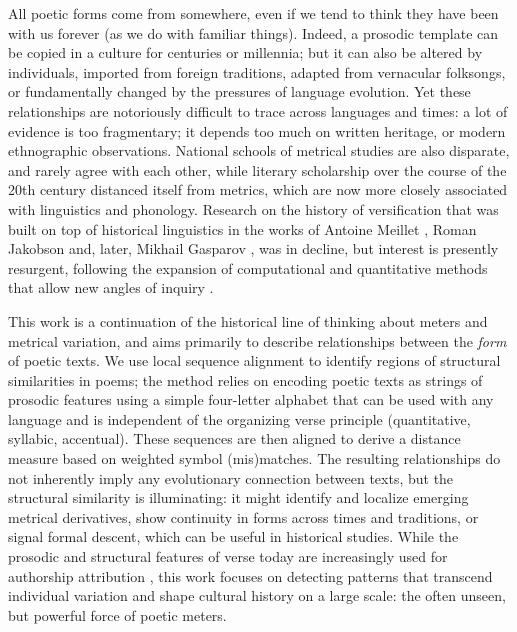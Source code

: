 \documentclass[
    hf
]{ceurart}
\begin{document}
All poetic forms come from somewhere, even if we tend to think they have been with us forever (as we do with familiar things). Indeed, a prosodic template can be copied in a culture for centuries or millennia; but it can also be altered by individuals, imported from foreign traditions, adapted from vernacular folksongs, or fundamentally changed by the pressures of language evolution. Yet these relationships are notoriously difficult to trace across languages and times: a lot of evidence is too fragmentary; it depends too much on written heritage, or modern ethnographic observations. National schools of metrical studies are also disparate, and rarely agree with each other, while literary scholarship over the course of the 20th century distanced itself from metrics, which are now more closely associated with linguistics and phonology. Research on the history of versification that was built on top of historical linguistics in the works of Antoine Meillet \cite{meillet_origines_1923}, Roman Jakobson \cite{jakobson_zur_1929} and, later, Mikhail Gasparov \cite{gasparov_history_1996}, was in decline, but interest is presently resurgent, following the expansion of computational and quantitative methods that allow new angles of inquiry \cite{polilova_spanish_2018, sela_semantics_2022,de_sisto_development_2023}.

This work is a continuation of the historical line of thinking about meters and metrical variation, and aims primarily to describe relationships between the \textit{form} of poetic texts. We use local sequence alignment to identify regions of structural similarities in poems; the method relies on encoding poetic texts as strings of prosodic features using a simple four-letter alphabet that can be used with any language and is independent of the organizing verse principle (quantitative, syllabic, accentual). These sequences are then aligned to derive a distance measure based on weighted symbol (mis)matches. The resulting relationships do not inherently imply any evolutionary connection between texts, but the structural similarity is illuminating: it might identify and localize emerging metrical derivatives, show continuity in forms across times and traditions, or signal formal descent, which can be useful in historical studies. While the prosodic and structural features of verse today are increasingly used for authorship attribution \cite{nagy_metre_2021, plechac_versification_2021}, this work focuses on detecting patterns that transcend individual variation and shape cultural history on a large scale: the often unseen, but powerful force of poetic meters.
\end{document}
